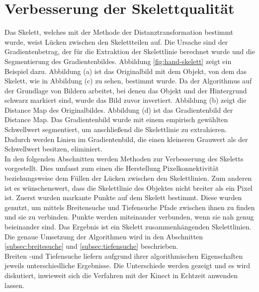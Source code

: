 \section{Verbesserung der Skelettqualität}
Das Skelett, welches mit der Methode der Distanztransformation bestimmt wurde, weist Lücken zwischen den Skelettteilen auf. Die Ursache sind der Gradientenbetrag, der für die Extraktion der Skelettlinie berechnet wurde und die Segmentierung des Gradientenbildes. Abbildung \ref{fig:hand-skelett} zeigt ein Beispiel dazu. Abbildung (a) ist das Originalbild mit dem Objekt, von dem das Skelett, wie in Abbildung (c) zu sehen, bestimmt wurde. Da der Algorithmus auf der Grundlage von Bildern arbeitet, bei denen das Objekt und der Hintergrund schwarz markiert sind,
wurde das Bild zuvor invertiert. Abbildung (b) zeigt die Distance Map des Originalbildes. Abbildung (d) ist das Gradientenbild der Distance Map. Das Gradientenbild wurde mit einem empirisch gewählten Schwellwert segmentiert, um anschließend die Skelettlinie zu extrahieren. Dadurch werden Linien im Gradientenbild, die einen kleineren Grauwert als der Schwellwert besitzen, eliminiert. \\
In den folgenden Abschnitten werden Methoden zur Verbesserung des Skeletts vorgestellt. Dies umfasst zum einen die Herstellung Pixelkonnektivität beziehungsweise dem Füllen der Lücken zwischen den Skelettlinien. Zum anderen ist es wünschenswert, dass die Skelettlinie des Objektes nicht breiter als ein Pixel ist. Zuerst wurden markante Punkte auf dem Skelett bestimmt. Diese wurden
genutzt, um mittels Breitensuche und Tiefensuche Pfade zwischen ihnen zu finden und sie zu verbinden. Punkte werden miteinander
verbunden, wenn sie nah genug beieinander sind. Das Ergebnis ist ein Skelett
zusammenhängenden Skelettlinien. Die genaue Umsetzung der Algorithmen wird in den Abschnitten \ref{subsec:breitesuche} und \ref{subsec:tiefensuche} beschrieben.\\
Breiten -und Tiefensuche liefern aufgrund ihrer algorithmischen Eigenschaften jeweils unterschiedliche Ergebnisse. Die Unterschiede werden gezeigt und es wird diskutiert, inwieweit sich die Verfahren mit der Kinect in Echtzeit anwenden lassen. 
